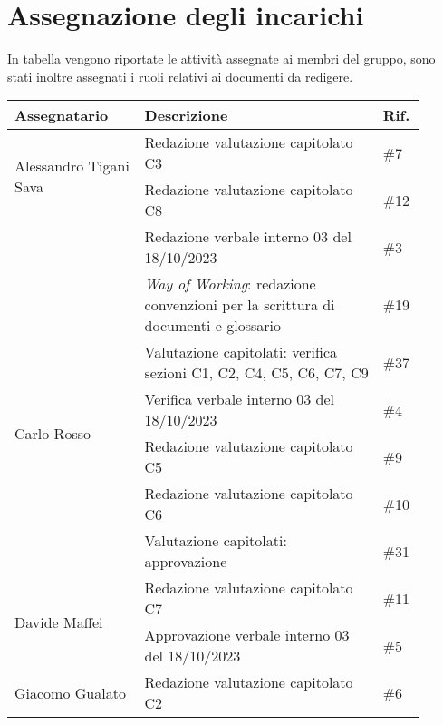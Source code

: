 \section{Assegnazione degli incarichi}
In tabella vengono riportate le attività assegnate ai membri del gruppo, sono stati inoltre assegnati i ruoli relativi ai documenti da redigere.

\begin{center}
    {
    \renewcommand{\arraystretch}{1.5}
    \begin{tabular}{p{0.30\linewidth}|p{0.55\linewidth}|p{0.05\linewidth}}
        \textbf{Assegnatario}                   &   \textbf{Descrizione}                        & \textbf{Rif.}     \\
        \hline
        \multirow{2}{*}{Alessandro Tigani Sava} & Redazione valutazione capitolato C3           & \#7   \\
        \cline{2-3}
                        & Redazione valutazione capitolato C8                                   & \#12  \\
        \cline{2-3}
                        & Redazione verbale interno 03 del 18/10/2023                           & \#3   \\
        \cline{2-3}
                        & \textit{Way of Working}: redazione convenzioni per la scrittura di documenti e glossario & \#19 \\
        \cline{2-3}
                        & Valutazione capitolati: verifica sezioni C1, C2, C4, C5, C6, C7, C9   & \#37  \\
        \hline 
        \multirow{2}{*}{Carlo Rosso}            & Verifica verbale interno 03 del 18/10/2023    & \#4   \\
        \cline{2-3}
                        & Redazione valutazione capitolato C5                                   & \#9   \\
        \cline{2-3}
                        & Redazione valutazione capitolato C6 									& \#10	\\
        \cline{2-3}
                        & Valutazione capitolati: approvazione  								& \#31  \\
        \hline
        \multirow{2}{*}{Davide Maffei}			& Redazione valutazione capitolato C7 			& \#11  \\
        \cline{2-3}
        	           	& Approvazione verbale interno 03 del 18/10/2023 						& \#5   \\
        \hline
        \multirow{2}{*}{Giacomo Gualato}        & Redazione valutazione capitolato C2 			& \#6   \\

\end{tabular}}
\end{center}

